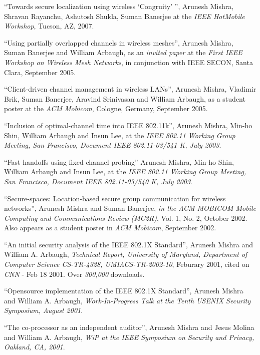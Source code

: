 \begin{resume}
\mybullet ``Towards secure localization using wireless `Congruity' '', Arunesh Mishra, Shravan Rayanchu, Ashutosh Shukla, Suman Banerjee
at the {\it IEEE HotMobile Workshop}, Tucson, AZ, 2007.

\mybullet ``Using partially overlapped channels in wireless meshes'', Arunesh Mishra, Suman Banerjee and William Arbaugh,
as an {\em invited paper} at the {\em First IEEE Workshop on Wireless Mesh Networks}, in conjunction with IEEE SECON,
Santa Clara, September 2005.

\mybullet ``Client-driven channel management in wireless LANs'', Arunesh Mishra, Vladimir Brik, Suman Banerjee, Aravind Srinivasan
and William Arbaugh, as a student poster at  the {\em ACM Mobicom}, Cologne, Germany, September 2005.

\mybullet ``Inclusion of optimal-channel time into IEEE 802.11k'', Arunesh Mishra,  Min-ho Shin, William Arbaugh and Insun Lee,
at the {\em IEEE 802.11 Working Group Meeting, San Francisco, Document IEEE 802.11-03/541 K, July 2003}.

\mybullet ``Fast handoffs using fixed channel probing'' Arunesh Mishra, Min-ho Shin, William Arbaugh and Insun Lee, at the 
{\em IEEE 802.11 Working Group Meeting, San Francisco, Document IEEE 802.11-03/540 K, July 2003}.

\mybullet ``Secure-spaces: Location-based secure group communication for wireless networks'', Arunesh Mishra and 
Suman Banerjee, {\em in the ACM MOBICOM Mobile Computing and Communications Review (MC2R)}, Vol. 1, No. 2, October 2002.
Also appears as a student poster in {\em ACM Mobicom}, September 2002.


\mybullet ``An initial security analysis of the IEEE 802.1X Standard'', Arunesh Mishra and William A. Arbaugh,
{\em Technical Report, University of Maryland, Department of Computer Science CS-TR-4328, 
UMIACS-TR-2002-10}, Feburary 2001, cited on {\em CNN} - Feb 18 2001. Over {\em 300,000} downloads.


\mybullet ``Opensource implementation of the IEEE 802.1X Standard'', Arunesh Mishra and William A. Arbaugh,
{\em Work-In-Progress Talk at the Tenth USENIX Security Symposium, August 2001}.


\mybullet ``The co-processor as an independent auditor'', Arunesh Mishra and Jesus Molina and William A. Arbaugh,
{\em WiP at the IEEE Symposium on Security and Privacy, Oakland, CA, 2001}.



\end{resume}
